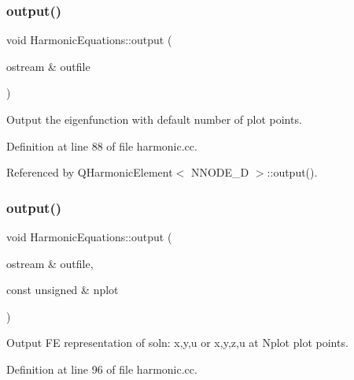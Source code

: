 \subsubsection{\texorpdfstring{output()}{output()}\hspace{0.1cm}{\footnotesize\ttfamily [1/2]}}
{\footnotesize\ttfamily void Harmonic\+Equations\+::output (\begin{DoxyParamCaption}\item[{ostream \&}]{outfile }\end{DoxyParamCaption})\hspace{0.3cm}{\ttfamily [inline]}}



Output the eigenfunction with default number of plot points. 



Definition at line 88 of file harmonic.\+cc.



Referenced by Q\+Harmonic\+Element$<$ N\+N\+O\+D\+E\+\_\+D $>$\+::output().

\mbox{\label{classHarmonicEquations_ab5e53f73bbefb6509ad014c3b236e31f}} 
\subsubsection{\texorpdfstring{output()}{output()}\hspace{0.1cm}{\footnotesize\ttfamily [2/2]}}
{\footnotesize\ttfamily void Harmonic\+Equations\+::output (\begin{DoxyParamCaption}\item[{ostream \&}]{outfile,  }\item[{const unsigned \&}]{nplot }\end{DoxyParamCaption})\hspace{0.3cm}{\ttfamily [inline]}}



Output FE representation of soln\+: x,y,u or x,y,z,u at Nplot plot points. 



Definition at line 96 of file harmonic.\+cc.

\mbox{\label{classHarmonicEquations_ab801694318460d371e066419263995d7}} 
